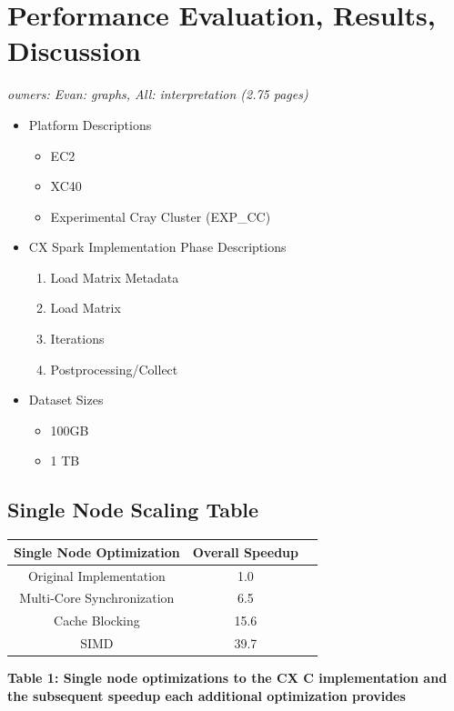 \section{Performance Evaluation, Results, Discussion}

\textit{owners: Evan: graphs, All: interpretation (2.75 pages)}

\begin{itemize}
\item Platform Descriptions
\begin{itemize}
  \item EC2

  \item XC40
  \item Experimental Cray Cluster (EXP\_CC)
\end{itemize}

\item CX Spark Implementation Phase Descriptions
 \begin{enumerate}
      \item Load Matrix Metadata
      \item Load Matrix
      \item Iterations
      \item Postprocessing/Collect
 \end{enumerate}

 \item Dataset Sizes
 \begin{itemize}
  \item 100GB

  \item 1 TB

\end{itemize}
 \end{itemize}




  \subsection{Single Node Scaling Table}

  \begin{center}
  \begin{tabular}{ |c|c|c| } 
  \hline
  Single Node Optimization & Overall Speedup\\
  \hline
  Original Implementation & 1.0  \\
  Multi-Core Synchronization & 6.5 \\
  Cache Blocking & 15.6 \\
  SIMD & 39.7 \\
  \hline

  \end{tabular}
  \end{center}
  \textbf{Table 1: Single node optimizations to the CX C implementation and the subsequent speedup each additional optimization provides}

